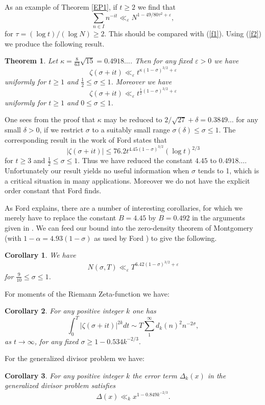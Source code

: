 \documentclass[a4paper,10pt]{article}
\newcommand{\ep}{\varepsilon}
\newcommand{\beql}[1]{\begin{equation}\label{#1}}
\newcommand{\eeq}{\end{equation}}
\newtheorem{theorem}{Theorem}
\newtheorem{corollary}{Corollary}
\begin{document}
As an example of Theorem \ref{EP1}, if $t\ge 2$ we find that
\beql{f2}
\sum_{n\in I}n^{-it}\ll_{\ep} N^{1-49/80\tau^2+\ep},
\eeq
for $\tau=(\log t)/(\log N)\ge 2$. This should be compared with
(\ref{f1}). Using (\ref{f2}) we produce the following result.
\begin{theorem}\label{rich}
Let $\kappa=\tfrac{8}{63}\sqrt{15}=0.4918\ldots$.  Then for any fixed
$\ep>0$ we have
\beql{rich1}
\zeta(\sigma+it)\ll_{\ep} t^{\kappa(1-\sigma)^{3/2}+\ep}
\eeq
uniformly for $t\ge 1$ and $\tfrac12\le\sigma\le 1$. Moreover we have
\beql{rich2}
\zeta(\sigma+it)\ll_{\ep} t^{\tfrac12 (1-\sigma)^{3/2}+\ep}
\eeq
uniformly for $t\ge 1$ and $0\le\sigma\le 1$.
\end{theorem}

One sees from the proof that $\kappa$ may be reduced to
$2/\sqrt{27}+\delta=0.3849\ldots$ for any small $\delta>0$, if we
restrict $\sigma$ to a suitably small range
$\sigma(\delta)\le\sigma\le 1$.
The corresponding result in the work of Ford \cite[Theorem 1]{ford}
states that
\[|\zeta(\sigma+it)|\le 76.2 t^{4.45(1-\sigma)^{3/2}}(\log t)^{2/3}\]
for $t\ge 3$ and $\tfrac12\le\sigma\le 1$.  Thus we have reduced the
constant $4.45$ to $0.4918\ldots$. Unfortunately our result yields no useful
information when $\sigma$ tends to 1, which is a critical situation in
many applications.  Moreover we do not have the explicit order constant
that Ford finds.

As Ford explains, there are a number of interesting corollaries, for which we
merely have to replace the constant $B=4.45$ by $B=0.492$ in the
arguments given in \cite[Pages 566 and 567]{ford}.  
We can feed our bound into the zero-density theorem of Montgomery
\cite[Theorem 12.3]{mont} (with $1-\alpha=4.93(1-\sigma)$ as used by Ford
\cite[Page 566]{ford}) to give the following.
\begin{corollary}
We have
\[N(\sigma,T)\ll_{\ep}T^{6.42(1-\sigma)^{3/2}+\ep}\]
for $\tfrac{9}{10}\le\sigma\le 1$.
\end{corollary}

For moments of the Riemann Zeta-function we have:
\begin{corollary}
For any positive integer $k$ one has
\[\int_{0}^T|\zeta(\sigma+it)|^{2k}dt\sim
T\sum_{1}^\infty d_k(n)^2n^{-2\sigma},\]
as $t\to\infty$, for any fixed $\sigma\ge 1-0.534 k^{-2/3}$.
\end{corollary}

For the generalized divisor problem we have:
\begin{corollary}
For any positive integer $k$ the error term $\Delta_k(x)$ in the
generalized divisor problem satisfies
\[\Delta(x)\ll_k x^{1-0.849 k^{-2/3}}.\]
\end{corollary}
\end{document}
